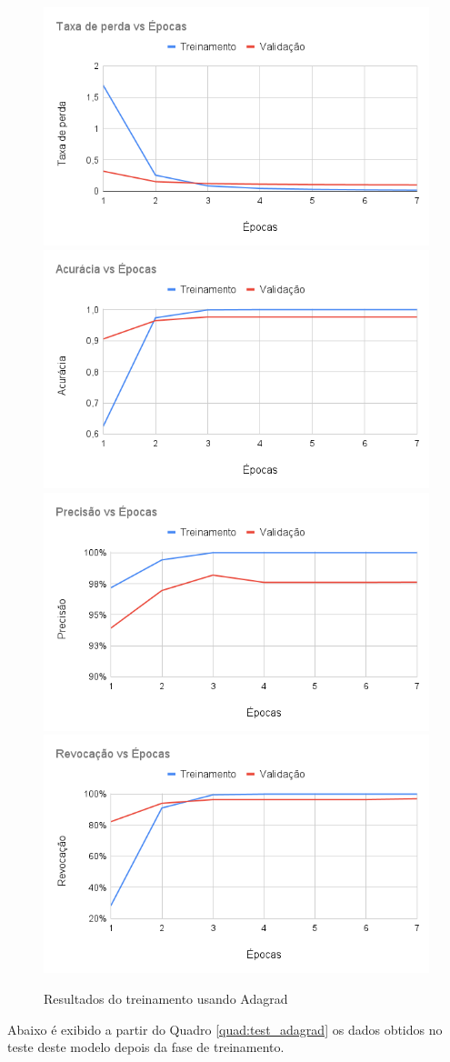 \documentclass[
	12pt,				%
	oneside,			%
	a4paper,			%
	english,			%
	brazil				%
	]{abntex2ppgsi}
\begin{document}
\begin{figure}[H]
    \centering
    \caption{Resultados do treinamento usando Adagrad}
    \includegraphics[width=.50\textwidth]{imagens/resultados_discussao/optimizer/adagrad/perda.png}\hfill
    \includegraphics[width=.50\textwidth]{imagens/resultados_discussao/optimizer/adagrad/acuracia.png}\bigbreak    \includegraphics[width=.50\textwidth]{imagens/resultados_discussao/optimizer/adagrad/precisao.png}\hfill
    \includegraphics[width=.50\textwidth]{imagens/resultados_discussao/optimizer/adagrad/revocacao.png}
    \label{fig:adagrad_training}
\end{figure}

Abaixo é exibido a partir do Quadro \ref{quad:test_adagrad} os dados obtidos no teste deste modelo depois da fase de treinamento.
\end{document}
